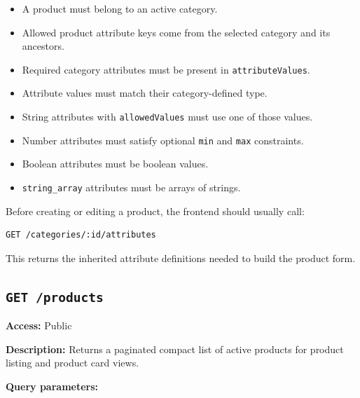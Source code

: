 \begin{itemize}
    \item A product must belong to an active category.
    \item Allowed product attribute keys come from the selected category and its ancestors.
    \item Required category attributes must be present in \texttt{attributeValues}.
    \item Attribute values must match their category-defined type.
    \item String attributes with \texttt{allowedValues} must use one of those values.
    \item Number attributes must satisfy optional \texttt{min} and \texttt{max} constraints.
    \item Boolean attributes must be boolean values.
    \item \texttt{string\_array} attributes must be arrays of strings.
\end{itemize}

Before creating or editing a product, the frontend should usually call:

\begin{verbatim}
GET /categories/:id/attributes
\end{verbatim}

This returns the inherited attribute definitions needed to build the product form.

\subsection{\texttt{GET /products}}

\textbf{Access:} Public

\textbf{Description:} Returns a paginated compact list of active products for product listing and product card views.

\textbf{Query parameters:}

